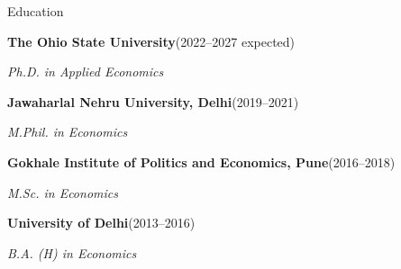 \documentclass{resume} %
\begin{document}
\begin{rSection}{Education}{}{}
\vspace{-1em}
\item 
\textbf{The Ohio State University}\hfill(2022--2027 expected)
\vspace{-0.5em}
\item \textit{Ph.D. in Applied Economics} %
\vspace{1mm}
\item 
\textbf{Jawaharlal Nehru University, Delhi}\hfill (2019--2021)
\vspace{-0.5em}
\item \textit{M.Phil. in Economics}
\vspace{1mm}

\item 
\textbf{Gokhale Institute of Politics and Economics, Pune}\hfill (2016--2018)
\vspace{-0.5em}
\item \textit{M.Sc. in Economics}
\vspace{1mm}

\item 
\textbf{University of Delhi}\hfill(2013--2016)
\vspace{-0.5em}
\item \textit{B.A. (H) in Economics}
\end{rSection}
\end{document}
